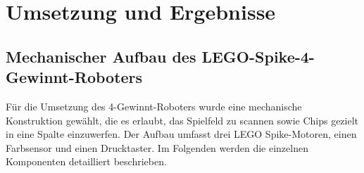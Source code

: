\chapter{Umsetzung und Ergebnisse}
\label{cha:umsetzung}



\section{Mechanischer Aufbau des LEGO-Spike-4-Gewinnt-Roboters}


Für die Umsetzung des 4-Gewinnt-Roboters wurde eine mechanische Konstruktion gewählt, die es erlaubt, das Spielfeld zu scannen sowie Chips gezielt in eine Spalte einzuwerfen. Der Aufbau umfasst drei LEGO Spike-Motoren, einen Farbsensor und einen Drucktaster. Im Folgenden werden die einzelnen Komponenten detailliert beschrieben.

